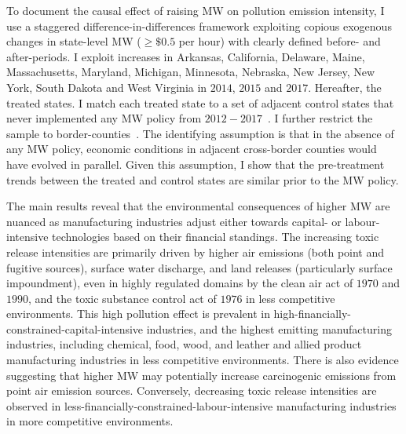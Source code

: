 \documentclass[12pt, english]{article}
\begin{document}
    To document the causal effect of raising MW on pollution emission intensity, I use a staggered difference-in-differences framework exploiting copious exogenous changes in state-level MW ($\geq \$0.5$ per hour) with clearly defined before- and after-periods. I exploit increases in Arkansas, California, Delaware, Maine, Massachusetts, Maryland, Michigan, Minnesota, Nebraska, New Jersey, New York, South Dakota and West Virginia in $2014$, $2015$ and $2017$. Hereafter, the treated states. I match each treated state to a set of adjacent control states that never implemented any MW policy from $2012-2017$~\parencite{gopalan2021state}. I further restrict the sample to border-counties~\parencite{dube2010minimum}. The identifying assumption is that in the absence of any MW policy, economic conditions in adjacent cross-border counties would have evolved in parallel. Given this assumption, I show that the pre-treatment trends between the treated and control states are similar prior to the MW policy.

    The main results reveal that the environmental consequences of higher MW are nuanced as manufacturing industries adjust either towards capital- or labour-intensive technologies based on their financial standings. The increasing toxic release intensities are primarily driven by higher air emissions (both point and fugitive sources), surface water discharge, and land releases (particularly surface impoundment), even in highly regulated domains by the clean air act of $1970$ and $1990$, and the toxic substance control act of $1976$ in less competitive environments. This high pollution effect is prevalent in high-financially-constrained-capital-intensive industries, and the highest emitting manufacturing industries, including chemical, food, wood, and leather and allied product manufacturing industries in less competitive environments. There is also evidence suggesting that higher MW may potentially increase carcinogenic emissions from point air emission sources. Conversely, decreasing toxic release intensities are observed in less-financially-constrained-labour-intensive manufacturing industries in more competitive environments.
\end{document}
